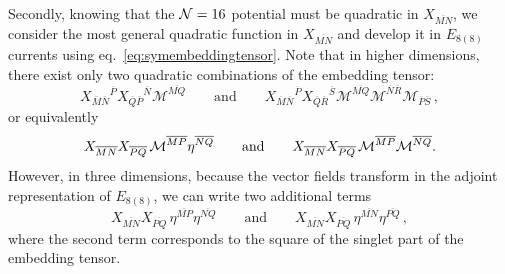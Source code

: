 \documentclass[a4paper, 11pt]{article}
\numberwithin{equation}{section}
\newcommand{\ov}[1]{\overline{#1}}
\newcommand{\EE}{\ensuremath{E_{8(8)}}\xspace}
\newcommand{\+}{\oplus}
\newcommand{\gM}{\mathcal{M}}
\newcommand{\fl}[1]{\ov{#1}}
\newcommand{\M}{\ensuremath{\mathcal{M}}\xspace}
\begin{document}
Secondly, knowing that the ${\cal N}=16$ potential must be quadratic in $X_{\fl{MN}}$, we consider the most general quadratic function in $X_{\fl{MN}}$ and develop it in \EE currents using eq.~\eqref{eq:symembeddingtensor}. Note that in higher dimensions, there exist only two quadratic combinations of the embedding tensor:
\begin{equation}
	X_{\fl{M}\fl{N}}{}^{\fl{P}} X_{\fl{Q}\fl{P}}{}^{\fl{N}} \gM^{\fl{MQ}} \qquad \text{and} \qquad X_{\fl{M}\fl{N}}{}^{\fl{P}} X_{\fl{Q}\fl{R}}{}^{\fl{S}} \gM^{\fl{MQ}} \gM^{\fl{N}\fl{R}} \gM_{\fl{P}\fl{S}} \,,
\end{equation}
or equivalently
\begin{equation}
	X_{\fl{MN}}X_{\fl{PQ}}\,\M^{\fl{MP}}\eta^{\fl{NQ}} \qquad {\rm and} \qquad X_{\fl{MN}}X_{\fl{PQ}}\,\M^{\fl{MP}}\M^{\fl{NQ}}.
\end{equation}
However, in three dimensions, because the vector fields transform in the adjoint representation of $\EE$, we can write two additional terms
\begin{equation} \label{eq:ExtraX2Terms}
	X_{\fl{MN}} X_{\fl{PQ}}\, \eta^{\fl{MP}} \eta^{\fl{NQ}} \qquad \text{and} \qquad X_{\fl{MN}} X_{\fl{PQ}}\, \eta^{\fl{MN}} \eta^{\fl{PQ}} \,,
\end{equation}
where the second term corresponds to the square of the singlet part of the embedding tensor.
\end{document}
